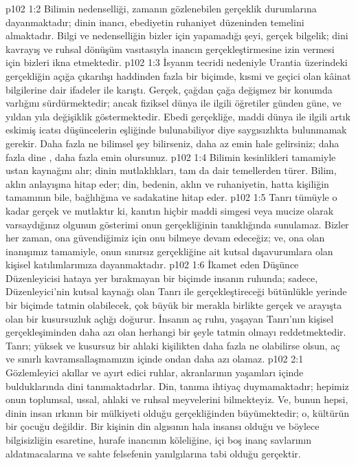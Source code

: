 \vs p102 1:2 Bilimin nedenselliği, zamanın gözlenebilen gerçeklik durumlarına dayanmaktadır; dinin inancı, ebediyetin ruhaniyet düzeninden temelini almaktadır. Bilgi ve nedenselliğin bizler için yapamadığı şeyi, gerçek bilgelik; dini kavrayış ve ruhsal dönüşüm vasıtasıyla inancın gerçekleştirmesine izin vermesi için bizleri ikna etmektedir.
\vs p102 1:3 İsyanın tecridi nedeniyle Urantia üzerindeki gerçekliğin açığa çıkarılışı haddinden fazla bir biçimde, kısmi ve geçici olan kâinat bilgilerine dair ifadeler ile karıştı. Gerçek, çağdan çağa değişmez bir konumda varlığını sürdürmektedir; ancak fiziksel dünya ile ilgili öğretiler günden güne, ve yıldan yıla değişiklik göstermektedir. Ebedi gerçekliğe, maddi dünya ile ilgili artık eskimiş icatsı düşüncelerin eşliğinde bulunabiliyor diye saygısızlıkta bulunmamak gerekir. Daha fazla ne bilimsel şey bilirseniz, daha az emin hale gelirsiniz; daha fazla dine , daha fazla emin olursunuz.
\vs p102 1:4 Bilimin kesinlikleri tamamiyle ustan kaynağını alır; dinin mutlaklıkları, tam da  dair temellerden türer. Bilim, aklın anlayışına hitap eder; din, bedenin, aklın ve ruhaniyetin, hatta kişiliğin tamamının bile, bağlılığına ve sadakatine hitap eder.
\vs p102 1:5 Tanrı tümüyle o kadar gerçek ve mutlaktır ki, kanıtın hiçbir maddi simgesi veya mucize olarak varsaydığınız olgunun gösterimi onun gerçekliğinin tanıklığında sunulamaz. Bizler her zaman, ona güvendiğimiz için onu bilmeye devam edeceğiz; ve, ona olan inanışımız tamamiyle, onun sınırsız gerçekliğine ait kutsal dışavurumlara olan kişisel katılımlarımıza dayanmaktadır.
\vs p102 1:6 İkamet eden Düşünce Düzenleyicisi hataya yer bırakmayan bir biçimde insanın ruhunda; sadece, Düzenleyici’nin kutsal kaynağı olan Tanrı ile gerçekleştireceği bütünlükle yerinde bir biçimde tatmin olabilecek, çok büyük bir merakla birlikte gerçek ve arayışta olan bir kusursuzluk açlığı doğurur. İnsanın aç ruhu, yaşayan Tanrı’nın kişisel gerçekleşiminden daha azı olan herhangi bir şeyle tatmin olmayı reddetmektedir. Tanrı; yüksek ve kusursuz bir ahlaki kişilikten daha fazla ne olabilirse olsun, aç ve sınırlı kavramsallaşmamızın içinde ondan daha azı olamaz.
\vs p102 2:1 Gözlemleyici akıllar ve ayırt edici ruhlar, akranlarının yaşamları içinde bulduklarında dini tanımaktadırlar. Din, tanıma ihtiyaç duymamaktadır; hepimiz onun toplumsal, ussal, ahlaki ve ruhsal meyvelerini bilmekteyiz. Ve, bunun hepsi, dinin insan ırkının bir mülkiyeti olduğu gerçekliğinden büyümektedir; o, kültürün bir çocuğu değildir. Bir kişinin din algısının hala insansı olduğu ve böylece bilgisizliğin esaretine, hurafe inancının köleliğine, içi boş inanç savlarının aldatmacalarına ve sahte felsefenin yanılgılarına tabi olduğu gerçektir.
